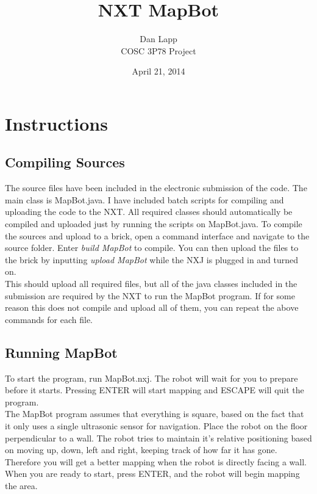 \documentclass[12pt]{article}
\title{NXT MapBot}
\author{Dan Lapp\\COSC 3P78 Project}
\date{April 21, 2014}
\begin{document}
\maketitle

    \thispagestyle{empty}
    \tableofcontents
    \thispagestyle{empty}
    \clearpage
    \setcounter{page}{1}
    
    \section{Instructions}
	\subsection{Compiling Sources}
		The source files have been included in the electronic submission of the code. The main class is MapBot.java. I have included batch scripts for compiling and uploading the code to the NXT. All required classes should automatically be compiled and uploaded just by running the scripts on MapBot.java. To compile the sources and upload to a brick, open a command interface and navigate to the source folder. Enter \emph{build MapBot} to compile. You can then upload the files to the brick by inputting \emph{upload MapBot} while the NXJ is plugged in and turned on. \\

	This should upload all required files, but all of the java classes included in the submission are required by the NXT to run the MapBot program. If for some reason this does not compile and upload all of them, you can repeat the above commands for each file.

	\subsection{Running MapBot}

		To start the program, run MapBot.nxj. The robot will wait for you to prepare before it starts. Pressing ENTER will start mapping and ESCAPE will quit the program.\\

		The MapBot program assumes that everything is square, based on the fact that it only uses a single ultrasonic sensor for navigation. Place the robot on the floor perpendicular to a wall. The robot tries to maintain it's relative positioning based on moving up, down, left and right, keeping track of how far it has gone. Therefore you will get a better mapping when the robot is directly facing a wall. When you are ready to start, press ENTER, and the robot will begin mapping the area.\\
\end{document}
